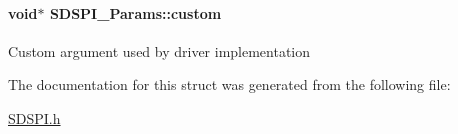 \paragraph[{custom}]{\setlength{\rightskip}{0pt plus 5cm}void$\ast$ S\+D\+S\+P\+I\+\_\+\+Params\+::custom}\label{struct_s_d_s_p_i___params_ae5376d1a99dd29d9213c94b46df69ea8}
Custom argument used by driver implementation 

The documentation for this struct was generated from the following file\+:\begin{DoxyCompactItemize}
\item 
\hyperlink{_s_d_s_p_i_8h}{S\+D\+S\+P\+I.\+h}\end{DoxyCompactItemize}
